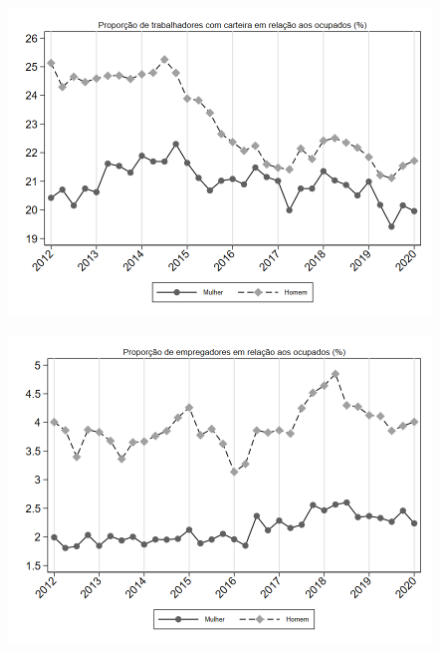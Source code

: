 \begin{frame}[label=_composicao_demografica_genero_prop_empregadoCC]{}
\textit{\hyperlink{_composicao_demografica_genero}{}}
\begin{figure}
  \centering
  \includegraphics[width=1.0\linewidth]{../../analysis/output/composicao_demografica/genero/_composicao_demografica_genero_prop_empregadoCC.png}
  \caption{}
  \label{fig:_composicao_demografica_genero_prop_empregadoCC}
\end{figure}
\end{frame}

\begin{frame}[label=_composicao_demografica_genero_prop_empregador]{}
\textit{\hyperlink{_composicao_demografica_genero}{}}
\begin{figure}
  \centering
  \includegraphics[width=1.0\linewidth]{../../analysis/output/composicao_demografica/genero/_composicao_demografica_genero_prop_empregador.png}
  \caption{}
  \label{fig:_composicao_demografica_genero_prop_empregador}
\end{figure}
\end{frame}



